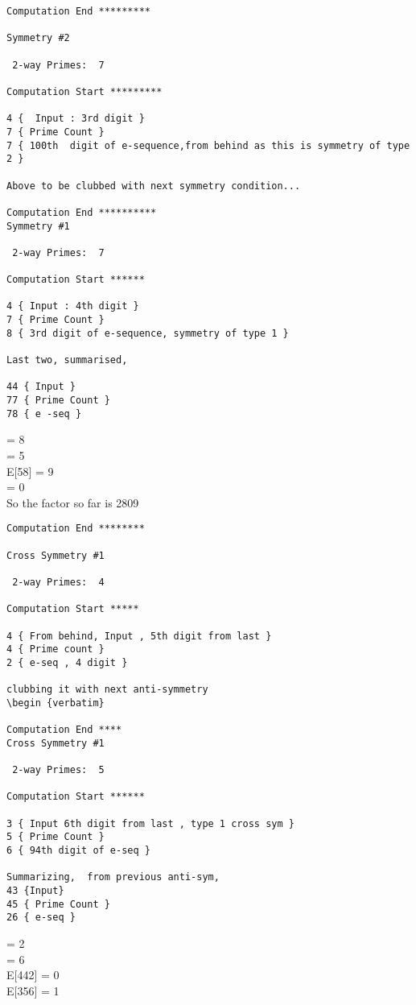 \begin{verbatim}
Computation End *********

Symmetry #2

 2-way Primes: 	7

Computation Start *********

4 {  Input : 3rd digit }
7 { Prime Count }
7 { 100th  digit of e-sequence,from behind as this is symmetry of type 2 }

Above to be clubbed with next symmetry condition...

Computation End **********
Symmetry #1

 2-way Primes: 	7

Computation Start ******

4 { Input : 4th digit }
7 { Prime Count }
8 { 3rd digit of e-sequence, symmetry of type 1 }

Last two, summarised,

44 { Input }
77 { Prime Count }
78 { e -seq }
\end {verbatim}
\Pi[774] = 8 \\ 
\Pi[874] = 5 \\
E[58] = 9\\
\Pi[85] = 0\\
So the factor so far is { 2809 }

\begin{verbatim}
Computation End ********

Cross Symmetry #1

 2-way Primes: 	4

Computation Start *****

4 { From behind, Input , 5th digit from last }
4 { Prime count }
2 { e-seq , 4 digit }

clubbing it with next anti-symmetry
\begin {verbatim}

Computation End ****
Cross Symmetry #1

 2-way Primes: 	5

Computation Start ******

3 { Input 6th digit from last , type 1 cross sym }
5 { Prime Count }
6 { 94th digit of e-seq }

Summarizing,  from previous anti-sym,
43 {Input}
45 { Prime Count }
26 { e-seq }
\end{verbatim}
\Pi[244] = 2 \\
\Pi[653] = 6 \\
E[442] = 0 \\
E[356] = 1 \\
